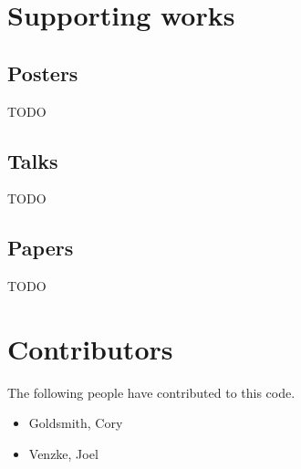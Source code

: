 \documentclass{article}
\begin{document}
\section{Supporting works} %
\label{sec:supporting_works}

\subsection{Posters} %
\label{sub:posters}
TODO
\subsection{Talks} %
\label{sub:talks}
TODO
\subsection{Papers} %
\label{sub:papers}
TODO

\section{Contributors} %
\label{sec:contributors}
The following people have contributed to this code.
\begin{itemize}
  \item Goldsmith, Cory
  \item Venzke, Joel
\end{itemize}
\end{document}
